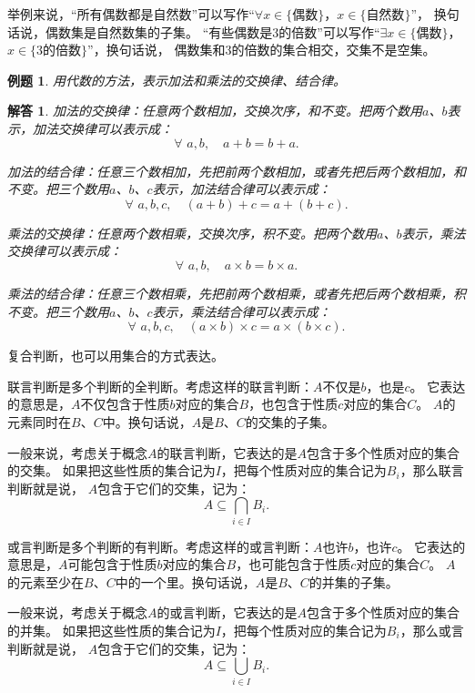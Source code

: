 \documentclass[12pt,UTF8]{ctexbook}
\newtheorem{et}{例题}[section]
\newtheorem*{so}{解答}
\begin{document}
举例来说，“所有偶数都是自然数”可以写作“$\forall x \in \{\mbox{偶数}\}$，$x \in \{\mbox{自然数}\}$”，
换句话说，偶数集是自然数集的子集。
“有些偶数是$3$的倍数”可以写作“$\exists x \in \{\mbox{偶数}\}$，$x \in \{3\mbox{的倍数}\}$”，换句话说，
偶数集和$3$的倍数的集合相交，交集不是空集。

\begin{et}
    用代数的方法，表示加法和乘法的交换律、结合律。
\end{et}

\begin{so}
    加法的交换律：任意两个数相加，交换次序，和不变。把两个数用$a$、$b$表示，加法交换律可以表示成：
    $$ \forall \,\, a, b, \quad a + b = b + a. $$
    
    加法的结合律：任意三个数相加，先把前两个数相加，或者先把后两个数相加，和不变。把三个数用$a$、$b$、$c$表示，加法结合律可以表示成：
    $$ \forall \,\, a, b, c, \quad (a + b) + c = a + (b + c). $$
    
    乘法的交换律：任意两个数相乘，交换次序，积不变。把两个数用$a$、$b$表示，乘法交换律可以表示成：
    $$ \forall \,\, a, b, \quad a \times b = b \times a. $$
    
    乘法的结合律：任意三个数相乘，先把前两个数相乘，或者先把后两个数相乘，积不变。把三个数用$a$、$b$、$c$表示，乘法结合律可以表示成：
    $$ \forall \,\, a, b, c, \quad (a \times b) \times c = a \times (b \times c). $$
\end{so}

复合判断，也可以用集合的方式表达。

联言判断是多个判断的全判断。考虑这样的联言判断：$A$不仅是$b$，也是$c$。
它表达的意思是，$A$不仅包含于性质$b$对应的集合$B$，也包含于性质$c$对应的集合$C$。
$A$的元素同时在$B$、$C$中。换句话说，$A$是$B$、$C$的交集的子集。

一般来说，考虑关于概念$A$的联言判断，它表达的是$A$包含于多个性质对应的集合的交集。
如果把这些性质的集合记为$I$，把每个性质对应的集合记为$B_i$，那么联言判断就是说，
$A$包含于它们的交集，记为：
$$ A \subseteq \bigcap_{i\in I} B_i. $$

或言判断是多个判断的有判断。考虑这样的或言判断：$A$也许$b$，也许$c$。
它表达的意思是，$A$可能包含于性质$b$对应的集合$B$，也可能包含于性质$c$对应的集合$C$。
$A$的元素至少在$B$、$C$中的一个里。换句话说，$A$是$B$、$C$的并集的子集。

一般来说，考虑关于概念$A$的或言判断，它表达的是$A$包含于多个性质对应的集合的并集。
如果把这些性质的集合记为$I$，把每个性质对应的集合记为$B_i$，那么或言判断就是说，
$A$包含于它们的交集，记为：
$$ A \subseteq \bigcup_{i\in I} B_i. $$
\end{document}
